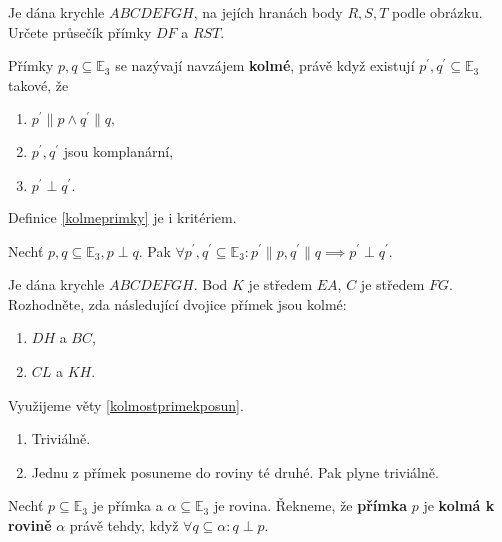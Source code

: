 \begin{priklad}
Je dána krychle $ABCDEFGH$, na jejích hranách body $R,S,T$ podle obrázku. Určete
průsečík přímky $DF$ a $RST$.
\end{priklad}

\begin{definition}\label{kolmeprimky}
    Přímky $p,q \subseteq \mathbb E_3$ se nazývají navzájem \textbf{kolmé}, právě když
    existují $p^\prime, q^\prime \subseteq \mathbb E_3$ takové, že
    \begin{enumerate}[$i.$]
    \item   $p^\prime \parallel p \land q^\prime \parallel q,$
   	\item $p^\prime, q^\prime$ jsou komplanární,
   	\item $p^\prime \perp q^\prime.$
    \end{enumerate}
\end{definition}

\begin{pozn}
    Definice \ref{kolmeprimky} je i kritériem.
\end{pozn}

\begin{veta}\label{kolmostprimekposun}
    Nechť $p,q \subseteq \mathbb E_3, p\perp q.$ Pak $\forall p^\prime, q^\prime
    \subseteq \mathbb E_3: p^\prime \parallel p, q^\prime \parallel q \implies
    p^\prime \perp q^\prime.$
\end{veta}

\begin{priklad}
Je dána krychle $ABCDEFGH$. Bod $K$ je středem $EA$, $C$ je středem $FG$. Rozhodněte,
zda následující dvojice přímek jsou kolmé:
\begin{enumerate}[$a.$]
\item $DH$ a $BC$,
\item $CL$ a $KH$.
\end{enumerate}
\end{priklad}

\begin{reseni}
Využijeme věty \ref{kolmostprimekposun}.
\begin{enumerate}[$a.$]
\item Triviálně.
\item Jednu z přímek posuneme do roviny té druhé. Pak plyne triviálně.
\end{enumerate}
\end{reseni}

\begin{definition}
    Nechť $p\subseteq \mathbb E_3$ je přímka a $\alpha \subseteq \mathbb E_3$ je rovina.
    Řekneme, že \textbf{přímka} $p$ je \textbf{kolmá k rovině} $\alpha$ právě tehdy,
    když $\forall q \subseteq \alpha: q \perp p.$
\end{definition}

